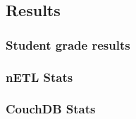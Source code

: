 \subsection{Results}

\subsubsection*{Student grade results}

\subsubsection*{nETL Stats}

\subsubsection*{CouchDB Stats}